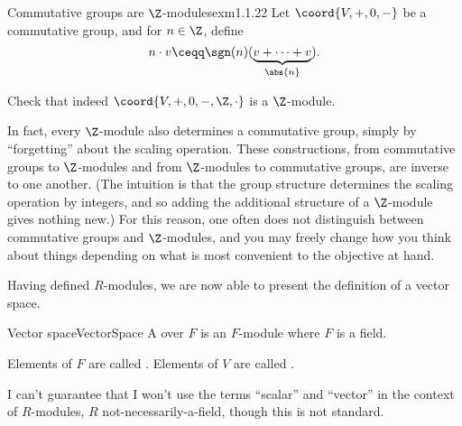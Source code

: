 \begin{exm}{Commutative groups are $\Z$-mod\-ules}{exm1.1.22}
	Let $\coord{V,+,0,-}$ be a commutative group, and for $n\in \Z$, define
	\begin{equation}
	n\cdot v\ceqq \sgn (n) (\underbrace{v+\cdots +v}_{\abs{n}}).
	\end{equation}
	\begin{exr}[breakable=false]{}{}
		Check that indeed $\coord{V,+,0,-,\Z ,\cdot}$ is a $\Z$-module.
	\end{exr}
	\begin{rmk}
		In fact, every $\Z$-module also determines a commutative group, simply by ``forgetting'' about the scaling operation.  These constructions, from commutative groups to $\Z$-modules and from $\Z$-modules to commutative groups, are inverse to one another.  (The intuition is that the group structure determines the scaling operation by integers, and so adding the additional structure of a $\Z$-module gives nothing new.)  For this reason, one often does not distinguish between commutative groups and $\Z$-modules, and you may freely change how you think about things depending on what is most convenient to the objective at hand.
	\end{rmk}
\end{exm}

Having defined $R$-modules, we are now able to present the definition of a vector space.
\begin{dfn}{Vector space}{VectorSpace}
A  over $F$ is an $F$-module where $F$ is a field.
\begin{rmk}
Elements of $F$ are called .  Elements of $V$ are called .
\end{rmk}
\begin{rmk}
I can't guarantee that I won't use the terms ``scalar'' and ``vector'' in the context of $R$-modules, $R$ not-necessarily-a-field, though this is not standard.
\end{rmk}
\end{dfn}

